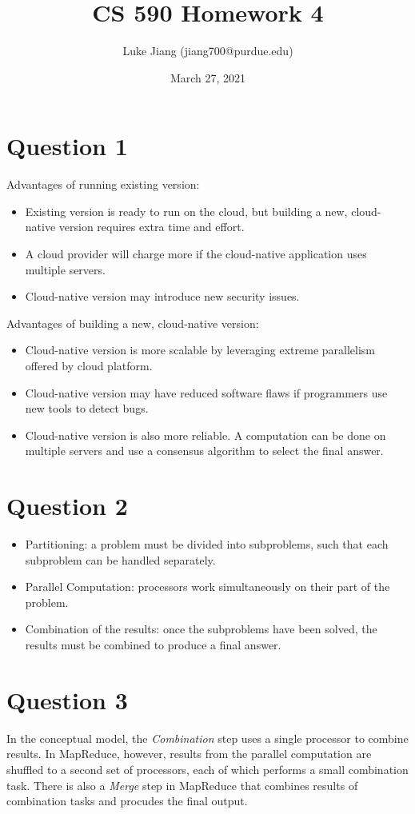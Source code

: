 \documentclass{article}
\title{CS 590 Homework 4}
\author{Luke Jiang (jiang700@purdue.edu) }
\date{March 27, 2021}
\begin{document}
\maketitle

\section{Question 1}
Advantages of running existing version:
\begin{itemize}
    \item Existing version is ready to run on the cloud, but building a new, cloud-native version requires extra time and effort.
    \item A cloud provider will charge more if the cloud-native application uses multiple servers.
    \item Cloud-native version may introduce new security issues.
\end{itemize}
Advantages of building a new, cloud-native version:
\begin{itemize}
    \item Cloud-native version is more scalable by leveraging extreme parallelism offered by cloud platform.
    \item Cloud-native version may have reduced software flaws if programmers use new tools to detect bugs.
    \item Cloud-native version is also more reliable. A computation can be done on multiple servers and use a consensus algorithm to select the final answer.
\end{itemize}

\section{Question 2}
\begin{itemize}
    \item Partitioning: a problem must be divided into subproblems, such that each subproblem can be handled separately.
    \item Parallel Computation: processors work simultaneously on their part of the problem.
    \item Combination of the results: once the subproblems have been solved, the results must be combined to produce a final answer.
\end{itemize}

\section{Question 3}
In the conceptual model, the \textit{Combination} step uses a single processor to combine results. In MapReduce, however, results from the parallel computation are shuffled to a second set of processors, each of which performs a small combination task. There is also a \textit{Merge} step in MapReduce that combines results of combination tasks and procudes the final output. 
\end{document}
